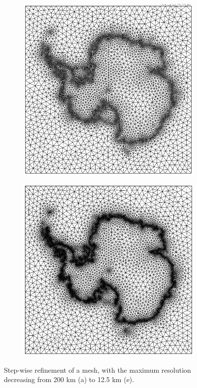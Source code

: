 \documentclass{article}
\begin{document}
\begin{figure}[H]
\begin{subfigure}[b]{0.3\linewidth}
    \caption{}
  \end{subfigure}
  \begin{subfigure}[b]{0.3\linewidth}
    \includegraphics[width=\linewidth]{Fig_mesh_step_04.png}
    \caption{}
  \end{subfigure}
  \begin{subfigure}[b]{0.3\linewidth}
    \includegraphics[width=\linewidth]{Fig_mesh_step_05.png}
    \caption{}
  \end{subfigure}
  \caption{Step-wise refinement of a mesh, with the maximum resolution decreasing from 200 km (a) to 12.5 km (e).}
\end{figure}
\end{document}
